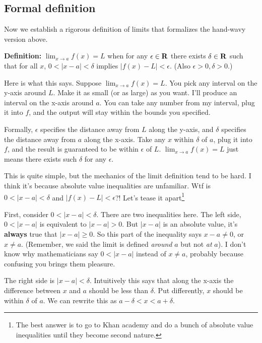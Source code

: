 \subsection{Formal definition}
Now we establish a rigorous definition of limits that formalizes the hand-wavy version above.

\vs

\textbf{Definition:} $\lim_{x\to a}f(x)=L$ when for any $\epsilon\in\mathbf{R}$ there exists $\delta\in\mathbf{R}$ such that for all $x$, $0<|x-a|<\delta$ implies $|f(x)-L|<\epsilon$. (Also $\epsilon>0, \delta>0$.)

\vs

Here is what this says. Suppose $\lim_{x\to a}f(x)=L$. You pick any interval on the y-axis around $L$. Make it as small (or as large) as you want. I'll produce an interval on the x-axis around $a$. You can take any number from my interval, plug it into $f$, and the output will stay within the bounds you specified.

\vs

Formally, $\epsilon$ specifies the distance away from $L$ along the y-axis, and $\delta$ specifies the distance away from $a$ along the x-axis. Take any $x$ within $\delta$ of $a$, plug it into $f$, and the result is guaranteed to be within $\epsilon$ of $L$. $\lim_{x\to a}f(x)=L$ just means there exists such $\delta$ for any $\epsilon$.

\vs

This is quite simple, but the mechanics of the limit definition tend to be hard. I think it's because absolute value inequalities are unfamiliar. Wtf is $0<|x-a|<\delta$ and $|f(x)-L|<\epsilon$?! Let's tease it apart\footnote{The best answer is to go to Khan academy and do a bunch of absolute value inequalities until they become second nature.}

\vs

First, consider $0<|x-a|<\delta$. There are two inequalities here. The left side, $0<|x-a|$ is equivalent to $|x-a|>0$. But $|x-a|$ is an absolute value, it's \textbf{always} true that $|x-a|\geq 0$. So this part of the inequality says $x-a\neq 0$, or $x\neq a$. (Remember, we said the limit is defined \textit{around} $a$ but not \textit{at} $a$). I don't know why mathematicians say $0<|x-a|$ instead of $x\neq a$, probably because confusing you brings them pleasure.

\vs

The right side is $|x-a|<\delta$. Intuitively this says that along the x-axis the difference between $x$ and $a$ should be less than $\delta$. Put differently, $x$ should be within $\delta$ of $a$. We can rewrite this as $a-\delta<x<a+\delta$.

